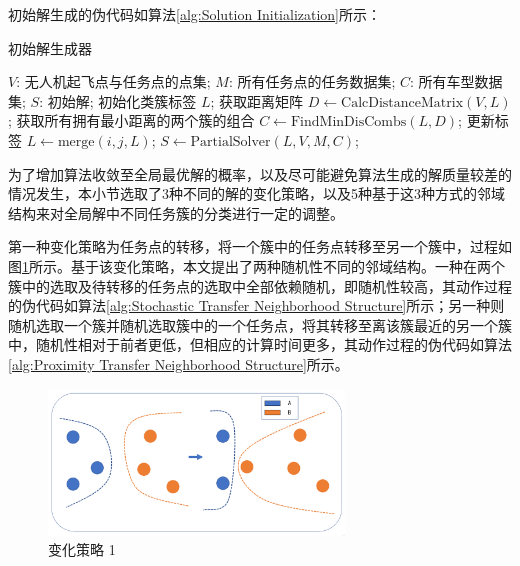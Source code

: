 初始解生成的伪代码如算法\ref{alg:Solution Initialization}所示：

\begin{algorithm}[!htbp]
  \caption{初始解生成器} %
  \label{alg:Solution Initialization}
  \begin{algorithmic}[1]
    \REQUIRE 
      \( V \): 无人机起飞点与任务点的点集;
      \( M \): 所有任务点的任务数据集;
      \( C \): 所有车型数据集;
    \ENSURE 
      \( S \): 初始解;
    \STATE 初始化类簇标签 \( L \);
    \REPEAT
        \STATE 获取距离矩阵 \(D \gets \textrm{CalcDistanceMatrix}(V, L) \);
        \STATE 获取所有拥有最小距离的两个簇的组合 \(C \gets \textrm{FindMinDisCombs}(L, D) \);
                \STATE 更新标签 \( L \gets \textrm{merge}(i, j, L) \);
            \ENDIF
        \ENDFOR
    \STATE \( S \gets \textrm{PartialSolver}(L, V, M, C) \);
  \end{algorithmic}
\end{algorithm}

为了增加算法收敛至全局最优解的概率，以及尽可能避免算法生成的解质量较差的情况发生，本小节选取了3种不同的解的变化策略，以及5种基于这3种方式的邻域结构来对全局解中不同任务簇的分类进行一定的调整。

第一种变化策略为任务点的转移，将一个簇中的任务点转移至另一个簇中，过程如图\ref{fig:conversion_way_1}所示。基于该变化策略，本文提出了两种随机性不同的邻域结构。一种在两个簇中的选取及待转移的任务点的选取中全部依赖随机，即随机性较高，其动作过程的伪代码如算法\ref{alg:Stochastic Transfer Neighborhood Structure}所示；另一种则随机选取一个簇并随机选取簇中的一个任务点，将其转移至离该簇最近的另一个簇中，随机性相对于前者更低，但相应的计算时间更多，其动作过程的伪代码如算法\ref{alg:Proximity Transfer Neighborhood Structure}所示。

\begin{figure}[!htbp]
    \centering
    \includegraphics[width=0.7\textwidth]{images/全局邻域1_en.png}
    \caption{变化策略 1}
    \label{fig:conversion_way_1}
\end{figure}

